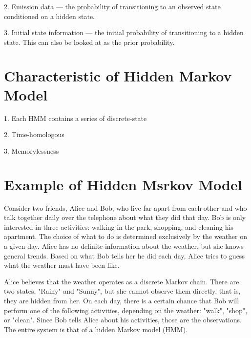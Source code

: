 \documentclass{article}
\begin{document}
2.	Emission data — the probability of transitioning to an observed state conditioned on a hidden state.

3.	Initial state information — the initial probability of transitioning to a hidden state. This can also be looked at as the prior probability.

\section{Characteristic of Hidden Markov Model}

1. Each HMM contains a series of discrete-state

2. Time-homologous

3. Memorylessness

\section{Example of Hidden Msrkov Model}

Consider two friends, Alice and Bob, who live far apart from each other and who talk together daily over the telephone about what they did that day. Bob is only interested in three activities: walking in the park, shopping, and cleaning his apartment. The choice of what to do is determined exclusively by the weather on a given day. Alice has no definite information about the weather, but she knows general trends. Based on what Bob tells her he did each day, Alice tries to guess what the weather must have been like.

Alice believes that the weather operates as a discrete Markov chain. There are two states, "Rainy" and "Sunny", but she cannot observe them directly, that is, they are hidden from her. On each day, there is a certain chance that Bob will perform one of the following activities, depending on the weather: "walk", "shop", or "clean". Since Bob tells Alice about his activities, those are the observations. The entire system is that of a hidden Markov model (HMM).
\end{document}
